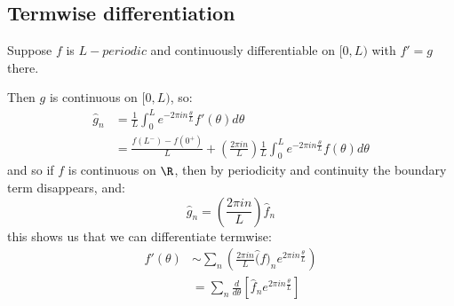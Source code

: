 \documentclass[../Main.tex]{subfiles}
\begin{document}
\subsection{Termwise differentiation}
Suppose $f$ is $L-periodic$ and continuously differentiable on $[0, L)$ with $f' = g$ there.

Then $g$ is continuous on $[0, L)$, so:
\begin{align*}
    \hat{g}_n &= \frac{1}{L} \int_{0}^{L} e^{-2\pi i n \frac{\theta}{L}} f'(\theta) d\theta \\
    &= \frac{f(L^-) - f(0^+)}{L} + \left(\frac{2\pi i n}{L}\right)\frac{1}{L} \int_{0}^{L} e^{-2\pi i n \frac{\theta}{L}}f(\theta) d\theta
\end{align*}
and so if $f$ is continuous on $\R$, then by periodicity and continuity the boundary term disappears, and:
\begin{equation*}
    \hat{g}_n = \left(\frac{2\pi i n}{L}\right) \hat{f}_n
\end{equation*}
this shows us that we can differentiate termwise:
\begin{align*}
    f'(\theta) &\sim \sum_n \left(\frac{2\pi i n}{L}\hat(f)_n e^{2\pi i n \frac{\theta}{L}}\right) \\
    &= \sum_n \frac{d}{d\theta} \left[\hat{f}_n e^{2\pi i n \frac{\theta}{L}}\right]
\end{align*}
\end{document}
